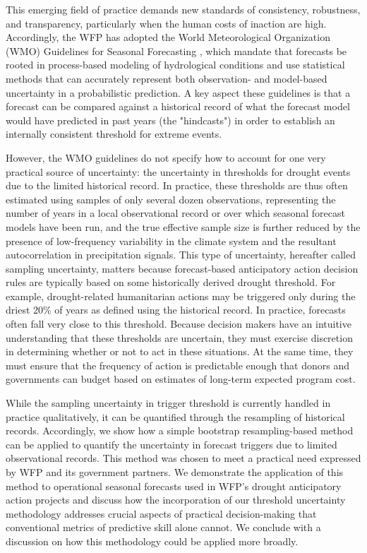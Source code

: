 \documentclass{ametsocV6.1}
\begin{document}
This emerging field of practice demands new standards of consistency, robustness, and transparency, particularly when the human costs of inaction are high. Accordingly, the WFP has adopted the World Meteorological Organization (WMO) Guidelines for Seasonal Forecasting \citep{world_meteorological_organization_guidance_2020}, which mandate that forecasts be rooted in process-based modeling of hydrological conditions and use statistical methods that can accurately represent both observation- and model-based uncertainty in a probabilistic prediction. A key aspect these guidelines is that a forecast can be compared against a historical record of what the forecast model would have predicted in past years (the "hindcasts") in order to establish an internally consistent threshold for extreme events. 

However, the WMO guidelines do not specify how to account for one very practical source of uncertainty: the uncertainty in thresholds for drought events due to the limited historical record. In practice, these thresholds are thus often estimated using samples of only several dozen observations, representing the number of years in a local observational record or over which seasonal forecast models have been run, and the true effective sample size is further reduced by the presence of low-frequency variability in the climate system and the resultant autocorrelation in precipitation signals. This type of uncertainty, hereafter called sampling uncertainty, matters because forecast-based anticipatory action decision rules are typically based on some historically derived drought threshold. For example, drought-related humanitarian actions may be triggered only during the driest 20\% of years as defined using the historical record. In practice, forecasts often fall very close to this threshold. Because decision makers have an intuitive understanding that these thresholds are uncertain, they must exercise discretion in determining whether or not to act in these situations. At the same time, they must ensure that the frequency of action is predictable enough that donors and governments can budget based on estimates of long-term expected program cost. 

While the sampling uncertainty in trigger threshold is currently handled in practice qualitatively, it can be quantified through the resampling of historical records. Accordingly, we show how a simple bootstrap resampling-based method can be applied to quantify the uncertainty in forecast triggers due to limited observational records. This method was chosen to meet a practical need expressed by WFP and its government partners. We demonstrate the application of this method to operational seasonal forecasts used in WFP's drought anticipatory action projects and discuss how the incorporation of our threshold uncertainty methodology addresses crucial aspects of practical decision-making that conventional metrics of predictive skill alone cannot. We conclude with a discussion on how this methodology could be applied more broadly.
\end{document}
